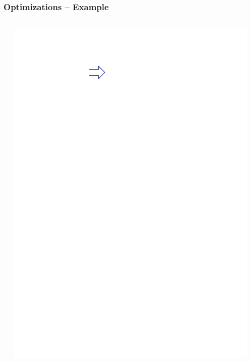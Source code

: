 \documentclass[navbaroff,en]{sdqbeamer}
\begin{document}
\begin{frame}
    \frametitle{Optimizations -- Example}

	\begin{columns}
		\centering
		\begin{column}{0.2\textwidth}
			\centering
			
		\end{column}
		\begin{column}{0.05\textwidth}
			\centering
			\includegraphics[scale=0.7]{images/arrow.ipe.pdf}
		\end{column}
		\begin{column}{0.2\textwidth}
			\centering
			\scalebox{0.2}{}
		\end{column}
	\end{columns}
\end{frame}
\end{document}
